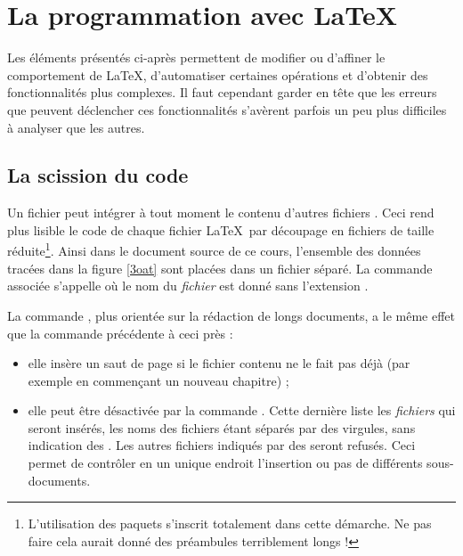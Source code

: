 
\chapter{La programmation avec \LaTeX}

Les éléments présentés ci-après permettent de modifier ou d'affiner le comportement de \LaTeX, d'automatiser certaines opérations et d'obtenir des fonctionnalités plus complexes. Il faut cependant garder en tête que les erreurs que peuvent déclencher ces fonctionnalités s'avèrent parfois un peu plus difficiles à analyser que les autres.

\section{La scission du code} 
\label{scission}
Un fichier  peut intégrer à tout moment le contenu d'autres fichiers . Ceci rend plus lisible le code de chaque fichier \LaTeX\ par découpage en fichiers de taille réduite\footnote{L'utilisation des paquets s'inscrit totalement dans cette démarche. Ne pas faire cela aurait donné des préambules terriblement longs !}. Ainsi dans le document source de ce cours, l'ensemble des données tracées dans la figure \ref{3oat} sont placées dans un fichier  séparé. La commande associée s'appelle  où le nom du \emph{fichier} est donné sans l'extension .

La  commande , plus orientée sur la rédaction de longs documents, a le même effet que la  commande précédente à ceci près :
\begin{itemize}
\item elle insère un saut de page si le fichier contenu ne le fait pas déjà (par exemple en commençant un nouveau chapitre) ;
\item elle peut être désactivée par la  commande . Cette dernière liste les \emph{fichiers} qui seront insérés, les noms des fichiers étant séparés par des virgules, sans indication des . Les autres fichiers indiqués par des  seront refusés. Ceci permet de contrôler en un unique endroit l'insertion ou pas de différents sous-documents. \\
\end{itemize}

